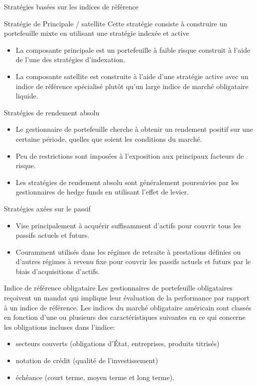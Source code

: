 \documentclass[10pt,a4paper]{beamer}
\begin{document}
\begin{frame}{Stratégies basées sur les indices de référence}
\begin{block}{Stratégie de Principale / satellite}
Cette stratégie consiste à construire un portefeuille mixte en utilisant une stratégie indexée et active
\begin{itemize}[label=\bullet]
\item La composante principale est un portefeuille à faible risque construit à l'aide de l'une des stratégies d'indexation.
\item La composante satellite est construite à l'aide d'une stratégie active avec un indice de référence spécialisé plutôt qu'un large indice de marché obligataire liquide.
\end{itemize}
\end{block}
\end{frame}

\begin{frame}{Stratégies de rendement absolu}
\begin{itemize}[label=\bullet]
\item Le gestionnaire de portefeuille cherche à obtenir un rendement positif sur une certaine période, quelles que soient les conditions du marché.
\item Peu de restrictions sont imposées à l'exposition aux principaux facteurs de risque.
\item Les stratégies de rendement absolu sont généralement poursuivies par les gestionnaires de hedge funds en utilisant l'effet de levier.
\end{itemize}
\end{frame}

\begin{frame}{Stratégies axées sur le passif}
\begin{itemize}[label=\bullet]
\item Vise principalement à acquérir suffisamment d'actifs pour couvrir tous les passifs actuels et futurs.
\item Couramment utilisés dans les régimes de retraite à prestations définies ou d'autres régimes à revenu fixe pour couvrir les passifs actuels et futurs par le biais d'acquisitions d'actifs.
\end{itemize}
\end{frame}


\begin{frame}{Indice de référence obligataire}
Les gestionnaires de portefeuille obligataires reçoivent un mandat qui implique leur évaluation de la performance par rapport à un indice de référence.  Les indices du marché obligataire américain sont classés en fonction d'une ou plusieurs des caractéristiques suivantes en ce qui concerne les obligations incluses dans l'indice:
\begin{itemize}[label=\bullet]
\item secteurs couverts (obligations d'État,  entreprises,  produits titrisés)
\item notation de crédit (qualité de l'investissement) 
\item échéance (court terme,  moyen terme et long terme).
\end{itemize}
\end{frame}
\end{document}
